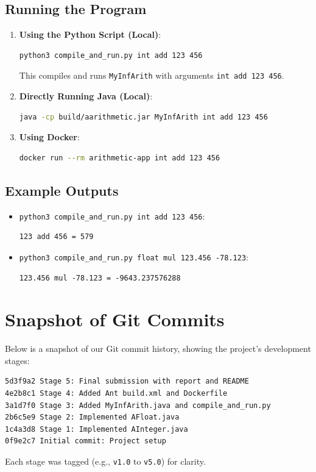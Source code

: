 \documentclass[a4paper,12pt]{article}
\begin{document}
\subsection{Running the Program}
\begin{enumerate}
    \item \textbf{Using the Python Script (Local)}:
    \begin{lstlisting}[language=bash]
python3 compile_and_run.py int add 123 456
    \end{lstlisting}
    This compiles and runs \texttt{MyInfArith} with arguments \texttt{int add 123 456}.

    \item \textbf{Directly Running Java (Local)}:
    \begin{lstlisting}[language=bash]
java -cp build/aarithmetic.jar MyInfArith int add 123 456
    \end{lstlisting}

    \item \textbf{Using Docker}:
    \begin{lstlisting}[language=bash]
docker run --rm arithmetic-app int add 123 456
    \end{lstlisting}
\end{enumerate}

\subsection{Example Outputs}
\begin{itemize}
    \item \texttt{python3 compile\_and\_run.py int add 123 456}:
    \begin{lstlisting}
123 add 456 = 579
    \end{lstlisting}
    \item \texttt{python3 compile\_and\_run.py float mul 123.456 -78.123}:
    \begin{lstlisting}
123.456 mul -78.123 = -9643.237576288
    \end{lstlisting}
\end{itemize}

\section{Snapshot of Git Commits}
Below is a snapshot of our Git commit history, showing the project’s development stages:
\begin{lstlisting}
5d3f9a2 Stage 5: Final submission with report and README
4e2b8c1 Stage 4: Added Ant build.xml and Dockerfile
3a1d7f0 Stage 3: Added MyInfArith.java and compile_and_run.py
2b6c5e9 Stage 2: Implemented AFloat.java
1c4a3d8 Stage 1: Implemented AInteger.java
0f9e2c7 Initial commit: Project setup
\end{lstlisting}
Each stage was tagged (e.g., \texttt{v1.0} to \texttt{v5.0}) for clarity.
\end{document}
